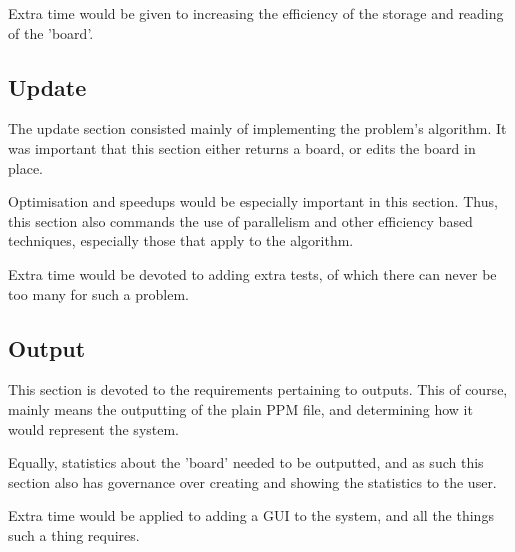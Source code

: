 		Extra time would be given to increasing the efficiency of the storage and reading of the 'board'.
	\subsection{Update}
		The update section consisted mainly of implementing the problem's algorithm.
		It was important that this section either returns a board, or edits the board in place.
		
		Optimisation and speedups would be especially important in this section.
		Thus, this section also commands the use of parallelism and other efficiency based techniques, especially those that apply to the algorithm.
		
		Extra time would be devoted to adding extra tests, of which there can never be too many for such a problem.
		
	\subsection{Output}
		This section is devoted to the requirements pertaining to outputs.
		This of course, mainly means the outputting of the plain PPM file, and determining how it would represent the system.

		Equally, statistics about the 'board' needed to be outputted, and as such this section also has governance over creating and showing the statistics to the user.

		Extra time would be applied to adding a GUI to the system, and all the things such a thing requires.
